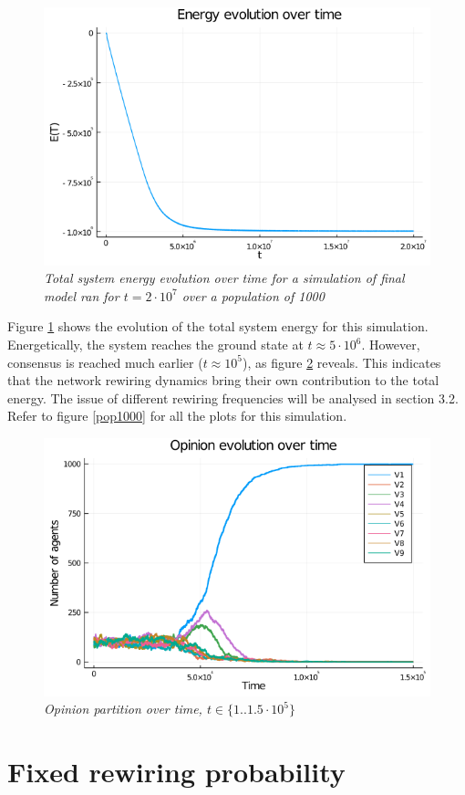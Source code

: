 \documentclass[12pt,openright,twoside]{book}
\begin{document}
\begin{figure}[!ht]
\centering
\includegraphics[width=0.65\linewidth]{figures/pop1000/energy_evolution_1-2_10e7.png}
\caption{\textit{{\small Total system energy evolution over time for a simulation of final model ran for $t=2\cdot 10^7$ over a population of 1000}}}
\label{pop1000:evol}
\end{figure}

Figure \ref{pop1000:evol} shows the evolution of the total system energy for this simulation. Energetically, the system reaches the ground state at $t\approx5\cdot 10^6$. However, consensus is reached much earlier ($t\approx10^5$), as figure \ref{pop1000:partition} reveals. This indicates that the network rewiring dynamics bring their own contribution to the total energy. The issue of different rewiring frequencies will be analysed in section 3.2. Refer to figure \ref{pop1000} for all the plots for this simulation.\\

\begin{figure}[!ht]
\centering
\includegraphics[width=0.65\linewidth]{figures/pop1000/opinion_evolution_1-15_10e4.png}
\caption{\textit{{\small Opinion partition over time, $t \in \{1..1.5\cdot 10^5\}$}}}
\label{pop1000:partition}
\end{figure}

\section{Fixed rewiring probability}
\end{document}
